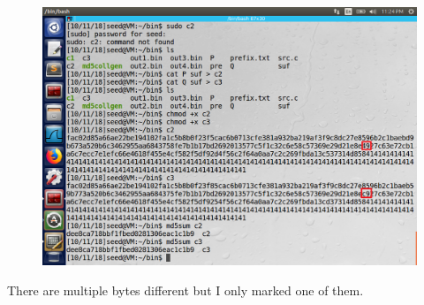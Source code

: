 \documentclass{article}
\begin{document}
\begin{figure}[H]\centering\includegraphics[width=\textwidth]{ss/13.png}\end{figure}
There are multiple bytes different but I only marked one of them.
\end{document}

